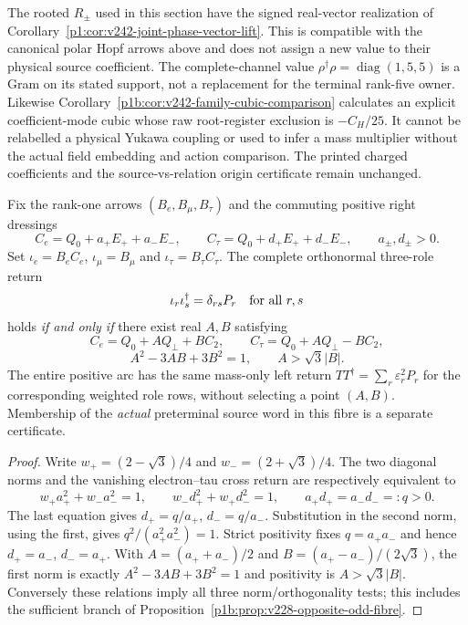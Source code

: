 \documentclass[12pt,a4paper]{article}
\begin{document}
\begin{remark}
\label{p6:rem:v242-geometric-provider-scope}
The rooted \(R_\pm\) used in this section have the signed real-vector
realization of Corollary~\ref{p1:cor:v242-joint-phase-vector-lift}.
This is compatible with the canonical polar Hopf arrows above and does
not assign a new value to their physical source coefficient.
The complete-channel value
\(\rho^\dagger\rho=\operatorname{diag}(1,5,5)\) is a Gram on its
stated support, not a replacement for the terminal rank-five owner.
Likewise Corollary~\ref{p1b:cor:v242-family-cubic-comparison}
calculates an explicit coefficient-mode cubic whose raw root-register
exclusion is \(-C_H/25\). It cannot be relabelled a physical Yukawa
coupling or used to infer a mass multiplier without the actual field
embedding and action comparison. The printed charged coefficients and
the source-vs-relation origin certificate remain unchanged.
\end{remark}



\begin{theorem}
\label{p6:thm:v229-opposite-odd-positive-converse}
Fix the rank-one arrows $(B_e,B_\mu,B_\tau)$ and the commuting positive
right dressings
\[
 C_e=Q_0+a_+E_++a_-E_-,\qquad
 C_\tau=Q_0+d_+E_++d_-E_-,\qquad a_\pm,d_\pm>0.
\]
Set $\iota_e=B_eC_e$, $\iota_\mu=B_\mu$ and
$\iota_\tau=B_\tau C_\tau$.  The complete orthonormal three-role return
\[
 \iota_r\iota_s^\dagger=\delta_{rs}P_r\quad\hbox{for all }r,s
\]
holds \emph{if and only if} there exist real $A,B$ satisfying
\[
 \boxed{C_e=Q_0+AQ_\perp+BC_2,\qquad
 C_\tau=Q_0+AQ_\perp-BC_2,}
\]
\[
 \boxed{A^2-3AB+3B^2=1,\qquad A>\sqrt3|B|.}
\]
The entire positive arc has the same mass-only left return
$TT^\dagger=\sum_r\varepsilon_r^2P_r$ for the corresponding weighted
role rows, without selecting a point $(A,B)$.  Membership of the
\emph{actual} preterminal source word in this fibre is a separate
certificate.
\end{theorem}
\begin{proof}
Write $w_+=(2-\sqrt3)/4$ and $w_-=(2+\sqrt3)/4$.
The two diagonal norms and the vanishing electron--tau cross return are
respectively equivalent to
\[
 w_+a_+^2+w_-a_-^2=1,\qquad
 w_-d_+^2+w_+d_-^2=1,\qquad a_+d_+=a_-d_-=:q>0.
\]
The last equation gives $d_+=q/a_+$, $d_-=q/a_-$.  Substitution in the
second norm, using the first, gives $q^2/(a_+^2a_-^2)=1$.
Strict positivity fixes $q=a_+a_-$ and hence $d_+=a_-$,
$d_-=a_+$.  With $A=(a_++a_-)/2$ and
$B=(a_+-a_-)/(2\sqrt3)$, the first norm is exactly
$A^2-3AB+3B^2=1$ and positivity is $A>\sqrt3|B|$.
Conversely these relations imply all three norm/orthogonality tests;
this includes the sufficient branch of
Proposition~\ref{p1b:prop:v228-opposite-odd-fibre}.
\end{proof}
\end{document}
